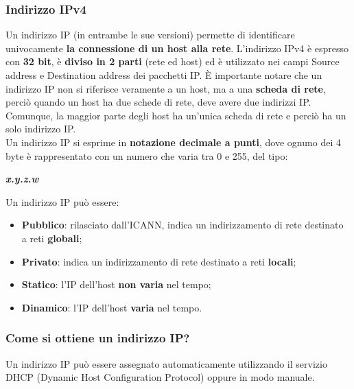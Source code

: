         \subsubsection*{Indirizzo IPv4}
            Un indirizzo IP (in entrambe le sue versioni) permette di identificare univocamente \textbf{la
            connessione di un host alla rete}. L’indirizzo IPv4 è espresso con \textbf{32 bit}, è \textbf{diviso in 2 parti}
            (rete ed host) ed è utilizzato nei campi Source address e Destination address dei pacchetti IP. È
            importante notare che un indirizzo IP non si riferisce veramente a un host, ma a una \textbf{scheda di
            rete}, perciò quando un host ha due schede di rete, deve avere due indirizzi IP. Comunque, la
            maggior parte degli host ha un’unica scheda di rete e perciò ha un solo indirizzo IP.\\
            
            Un indirizzo IP si esprime in \textbf{notazione decimale a punti}, dove ognuno dei 4 byte è
            rappresentato con un numero che varia tra 0 e 255, del tipo:
            
            \begin{center}
                \textbf{\emph{x.y.z.w}}
            \end{center}

            Un indirizzo IP può essere:

            \begin{itemize}
                \item \textbf{Pubblico}: rilasciato dall’ICANN, indica un indirizzamento di rete destinato a reti \textbf{globali};
                \item \textbf{Privato}: indica un indirizzamento di rete destinato a reti \textbf{locali};
                \item \textbf{Statico}: l’IP dell’host \textbf{non varia} nel tempo;
                \item \textbf{Dinamico}: l’IP dell’host \textbf{varia} nel tempo.
            \end{itemize}

        \subsubsection*{Come si ottiene un indirizzo IP?}
            Un indirizzo IP può essere assegnato automaticamente utilizzando il servizio DHCP (Dynamic
            Host Configuration Protocol) oppure in modo manuale.

